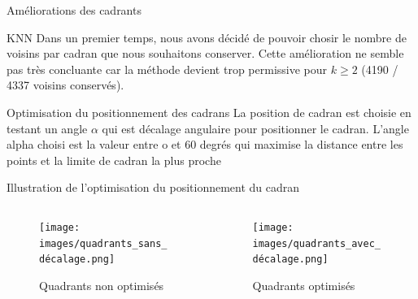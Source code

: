 \begin{frame}{Améliorations des cadrants}
    \begin{block}{KNN}
        Dans un premier temps, nous avons décidé de pouvoir chosir le nombre de voisins par cadran que nous souhaitons conserver.
        Cette amélioration ne semble pas très concluante car la méthode devient trop permissive pour $k \geq 2$ (4190 / 4337 voisins conservés).
    \end{block}
    \begin{block}{Optimisation du positionnement des cadrans}
        La position de cadran est choisie en testant un angle $\alpha$ qui est décalage angulaire pour positionner le cadran.
        L'angle alpha choisi est la valeur entre o et 60 degrés qui maximise la distance entre les points et la limite de cadran la plus proche
    \end{block}
\end{frame}

\begin{frame}{Illustration de l'optimisation du positionnement du cadran}
    \begin{columns}
        \begin{column}{0.5\textwidth}
            \begin{figure}
                \texttt{[image: images/quadrants\_sans\_décalage.png]}
                \caption{\label{fig:quad_sans_decalage} Quadrants non optimisés}
            \end{figure}
        \end{column}
        \begin{column}{0.5\textwidth}
            \begin{figure}
                \texttt{[image: images/quadrants\_avec\_décalage.png]}
                \caption{\label{fig:quad_avec_decalage} Quadrants optimisés}
            \end{figure}
        \end{column}
    \end{columns}
\end{frame}
